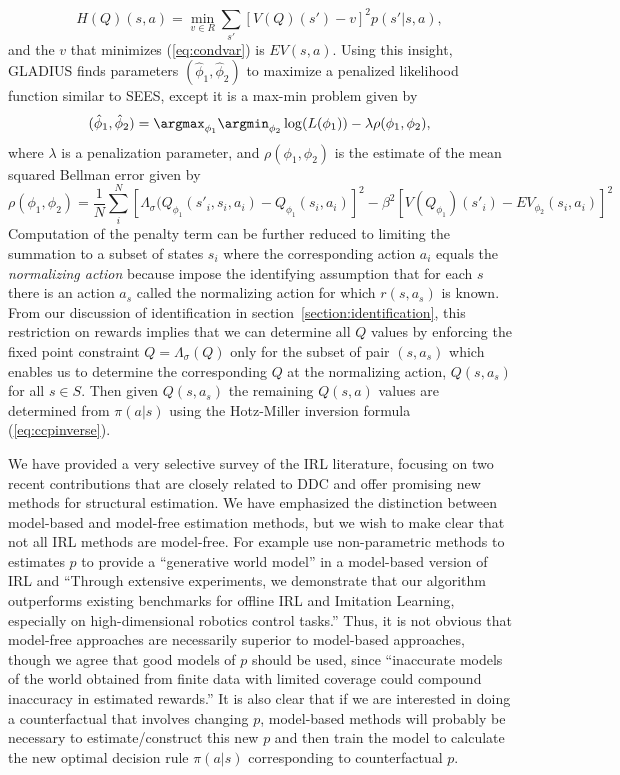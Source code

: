 \begin{equation}
             H(Q)(s,a) =\min_{v \in R} \sum_{s'}[V(Q)(s')-v]^2 p(s'|s,a),
\label{eq:condvar}
\end{equation}
and the $v$ that minimizes (\ref{eq:condvar}) is  $EV(s,a)$. Using this insight, GLADIUS finds parameters
$(\hat\phi_1,\hat\phi_2)$ to maximize a penalized likelihood function similar to SEES, except it is a max-min problem  given by
\begin{equation}
       (\hat\phi_1,\hat\phi_2) =\argmax_{\phi_1}\argmin_{\phi_2} \log(L(\phi_1))-\lambda\rho(\phi_1,\phi_2),
\label{eq:maxmin}
\end{equation}
where $\lambda$ is a penalization parameter, and $\rho(\phi_1,\phi_2)$ is the estimate of the mean squared Bellman error
given by
\begin{equation}
       \rho(\phi_1,\phi_2) =\frac{1}{N} \sum_i^N [\Lambda_\sigma(Q_{\phi_1}(s'_i,s_i,a_i)-Q_{\phi_1}(s_i,a_i)]^2 - \beta^2
 [V(Q_{\phi_1})(s'_i)-EV_{\phi_2}(s_i,a_i)]^2 
\label{eq:kangpenality}
\end{equation}
Computation of the penalty term can be further reduced to limiting the summation to a subset of states
$s_i$ where the corresponding action $a_i$ equals the {\it normalizing action\/} because
\cite{kang:2025} impose the identifying assumption that for each $s$ there is an action $a_s$ called the
normalizing action for which $r(s,a_s)$ is known. From our discussion of identification in section~\ref{section:identification}, this
restriction on rewards implies that we can determine all $Q$ values by enforcing the fixed point
constraint $Q=\Lambda_\sigma(Q)$ only for the subset of pair $(s,a_s)$ which enables us to determine the
corresponding $Q$ at the normalizing action,  $Q(s,a_s)$ for all $s \in S$. Then given $Q(s,a_s)$ the remaining
$Q(s,a)$ values are determined from $\pi(a|s)$ using the Hotz-Miller inversion  formula (\ref{eq:ccpinverse}).

We have provided a very selective survey of the
IRL literature, focusing on two recent contributions
that are closely related to DDC and offer promising new methods
for structural estimation.  We have emphasized the distinction between model-based and model-free
estimation methods, but we wish to make clear that not all IRL methods are model-free. 
For example \citet{zeng:2024} use non-parametric methods to estimates $p$ to provide a ``generative world model'' 
in a model-based version of IRL and ``Through extensive experiments, we demonstrate that our algorithm outperforms existing benchmarks for offline IRL and Imitation Learning, especially on high-dimensional robotics control tasks.'' 
Thus, it is not obvious that model-free approaches are necessarily superior to model-based approaches,
though we agree that good models of $p$ should be used, since  ``inaccurate models of the world obtained from finite data with limited coverage could compound inaccuracy in estimated rewards.''  It is also clear that if we are interested in 
doing a counterfactual that involves changing $p$, model-based methods will
probably be necessary to estimate/construct this new $p$ and
then train the model to calculate the new optimal decision rule $\pi(a|s)$ corresponding to counterfactual $p$.

